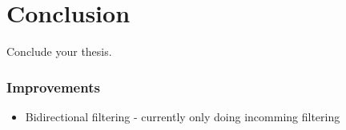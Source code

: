 \chapter[Conclusion]{Conclusion}
\label{Chap:Conclusion}

Conclude your thesis.



\subsection{Improvements}

\begin{itemize}
    \item Bidirectional filtering - currently only doing incomming filtering
\end{itemize}